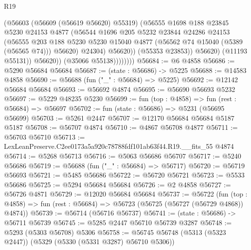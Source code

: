 \begin{lexlean}{R19}
\begin{coremodule}
                            (@56603
                              (@56609 (@56619 @56620) @55319)
                              (@56555
                                @1698
                                @188
                                @23845
                                @5230
                                @24153
                                @4877
                                (@56544
                                  @1696
                                  @205
                                  @5232
                                  @23844
                                  @24286
                                  @24153
                                  (@56555
                                    @203
                                    @188
                                    @5230
                                    @5230
                                    @15040
                                    @4877
                                    (@56562 @74 @15040 (@5389 (@56565 @74)))
                                    @56620)
                                  @24304)
                                @56620))
                            (@55353 @23853))
                          @56620)
                        (@11193 @55131))
                      @56620))
                  (@35066 @55138))))))))
@56684 := @6 @4858
@56686 := @5290 @56684 @56684
@56687 := (state : @56686) -> @5225
@56688 := @14583 @4858
@56690 := @56688 (fun ("_" : @56684) => @5225)
@56692 := @12142 @56684 @56684
@56693 := @56692 @4874
@56695 := @56690 @56693 @5232
@56697 := @5229 @48235 @5230
@56699 := fun (top : @4858) => fun (rest : @56684) => @56697
@56702 := fun (state : @56686) => @5231 (@56695 @56699)
@56703 := @5261 @2447
@56707 := @12170 @56684 @56684 @5187 @5187
@56708 := @56707 @4874
@56710 := @4867 @56708 @4877
@56711 := @56703 @56710
@56713 := LexLeanPreserve.C2ee0173a5a920c78788fdf101ab63f44.R19.__fits_55 @4874
@56714 := @5268 @56713
@56716 := @5063 @56686 @56707
@56717 := @5240 @56686
@56719 := @56688 (fun ("_" : @56684) => @56717)
@56720 := @56719 @56693
@56721 := @5485 @56686
@56722 := @56720 @56721
@56723 := @5533 @56686
@56725 := @5294 @56684 @56684
@56726 := @2 @4858
@56727 := @56726 @4871
@56729 := @12020 @56684 @56684
@56737 := @56722
    (fun (top : @4858) => fun (rest : @56684) => @56723 (@56725 (@56727 (@56729 @4868)) @4874))
@56739 := @56714 (@56716 @56737)
@56741 := (state : @56686) -> @56711 @56739
@56745 := @5285 @2447 @56710 @56739 @3287
@56748 := @5293 (@5303 @56708) @5306
@56758 := @56745 @56748 (@5313 (@5323 @2447)) (@5329 (@5330 (@5331 @3287) @56710 @5306))

\end{coremodule}
\end{lexlean}

